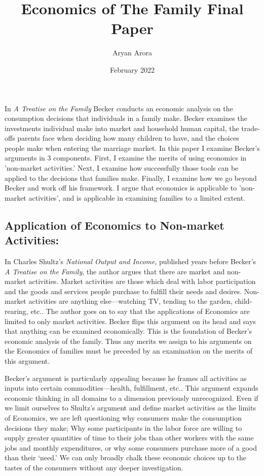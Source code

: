 \documentclass{article}
\title{Economics of The Family Final Paper}
\author{Aryan Arora}
\date{February 2022}
\begin{document}
\maketitle

In \textit{A Treatise on the Family} Becker conducts an economic analysis on the consumption decisions that individuals in a family make. Becker examines the investments individual make into market and household human capital, the trade-offs parents face when deciding how many children to have, and the choices people make when entering the marriage market. In this paper I examine Becker's arguments in 3 components. First, I examine the merits of  using economics in 'non-market activities.' Next, I examine how successfully those tools can be applied to the decisions that families make. Finally, I examine how we go beyond Becker and work off his framework. I argue that economics is applicable to 'non-market activities', and is applicable in examining families to a limited extent.

\subsection{Application of Economics to Non-market Activities:}

In Charles Shultz's \textit{National Output and Income}, published years before Becker’s \textit{A Treatise on the Family}, the author argues that there are market and non-market activities. Market activities are those which deal with labor participation and the goods and services people purchase to fulfill their needs and desires. Non-market activities are anything else—watching TV, tending to the garden, child-rearing, etc.. The author goes on to say that the applications of Economics are limited to only market activities. Becker flips this argument on its head and says that anything can be examined economically. This is the foundation of Becker's economic analysis of the family. Thus any merits we assign to his arguments on the Economics of families must be preceded by an examination on the merits of this argument. 

Becker's argument is particularly appealing because he frames all activities as inputs into certain commodities—health, fulfillment, etc.. This argument expands economic thinking in all domains to a dimension previously unrecognized. Even if we limit ourselves to Shultz’s argument and define market activities as the limits of Economics, we are left questioning why consumers make the consumption decisions they make; Why some participants in the labor force are willing to supply greater quantities of time to their jobs than other workers with the same jobs and monthly expenditures, or why some consumers purchase more of a good than their ‘need.’ We can only broadly chalk these economic choices up to the tastes of the consumers without any deeper investigation. 
\end{document}
